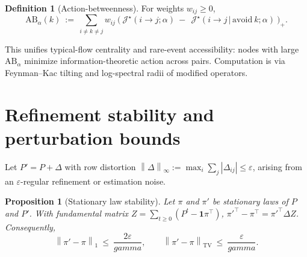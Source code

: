\documentclass[11pt]{article}
\def\sgap{gamma}%
\newcommand{\1}{\mathbbm{1}}
\newcommand{\TV}{\mathrm{TV}}
\newcommand{\norm}[1]{\left\lVert #1 \right\rVert}
\newcommand{\abs}[1]{\left\lvert #1 \right\rvert}
\newcommand{\sgap}{\gamma}
\theoremstyle{plain}
\newtheorem{proposition}[theorem]{Proposition}
\theoremstyle{definition}
\newtheorem{definition}[theorem]{Definition}
\begin{document}
\begin{definition}[Action-betweenness]
\label{def:ab}
For weights $w_{ij}\ge0$,
\begin{equation}
\mathrm{AB}_\alpha(k)\ :=\ \sum_{i\neq k\neq j} w_{ij}\ \Big(\ \mathcal J^\star(i\!\to\! j;\alpha)\ -\ \ \mathcal J^\star(i\!\to\! j\,|\,\mathrm{avoid}\ k;\alpha)\ \Big)_+.
\end{equation}
\end{definition}
This unifies typical-flow centrality and rare-event accessibility: nodes with large $\mathrm{AB}_\alpha$ minimize information-theoretic action across pairs. Computation is via Feynman--Kac tilting and log-spectral radii of modified operators.

\section{Refinement stability and perturbation bounds}
\label{sec:refine}
Let $P' = P+\Delta$ with row distortion $\norm{\Delta}_\infty:=\max_i \sum_j \abs{\Delta_{ij}}\le \varepsilon$, arising from an $\varepsilon$-regular refinement or estimation noise.

\begin{proposition}[Stationary law stability]
\label{prop:pi-stability}
Let $\pi$ and $\pi'$ be stationary laws of $P$ and $P'$. With fundamental matrix $Z=\sum_{t\ge0}(P^t-\mathbf 1\pi^\top)$, $\pi'^\top-\pi^\top=\pi'^\top \Delta Z$. Consequently,
\begin{equation}
\label{eq:piTV}
\norm{\pi'-\pi}_1\ \le\ \frac{2\varepsilon}{\sgap},\qquad \norm{\pi'-\pi}_{\TV}\ \le\ \frac{\varepsilon}{\sgap}.
\end{equation}
\end{proposition}
\end{document}
